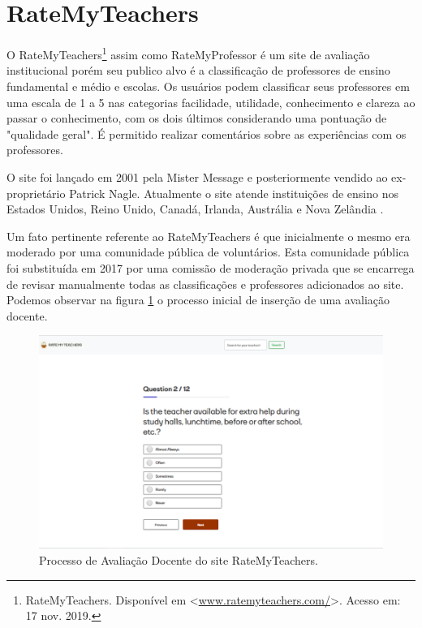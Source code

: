 \documentclass[12pt, a4paper]{report}
\begin{document}
\section{RateMyTeachers}

O RateMyTeachers\footnote{RateMyTeachers. Disponível em <\url{www.ratemyteachers.com/}>. Acesso em: 17 nov. 2019.} assim como RateMyProfessor é um site de avaliação institucional porém seu publico alvo é a classificação de professores de ensino fundamental e médio e escolas. Os usuários podem classificar seus professores em uma escala de 1 a 5 nas categorias facilidade, utilidade, conhecimento e clareza ao passar o conhecimento, com os dois últimos considerando uma pontuação de "qualidade geral". É permitido realizar comentários sobre as experiências com os professores.

O site foi lançado em 2001 pela Mister Message e posteriormente vendido ao ex-proprietário Patrick Nagle. Atualmente o site atende instituições de ensino nos Estados Unidos, Reino Unido, Canadá, Irlanda, Austrália e Nova Zelândia .

Um fato pertinente referente ao RateMyTeachers é que inicialmente o mesmo era moderado por uma comunidade pública de voluntários. Esta comunidade pública foi substituída em 2017 por uma comissão de moderação privada que se encarrega de revisar manualmente todas as classificações e professores adicionados ao site. Podemos observar na figura \ref{fig:ratemyteacher} o processo inicial de inserção de uma avaliação docente.

\begin{figure}
\centering
\includegraphics[scale=0.45]{ratemyteachers.png}
\caption{Processo de Avaliação Docente do site RateMyTeachers.}
\label{fig:ratemyteacher}
\end{figure}
\end{document}
